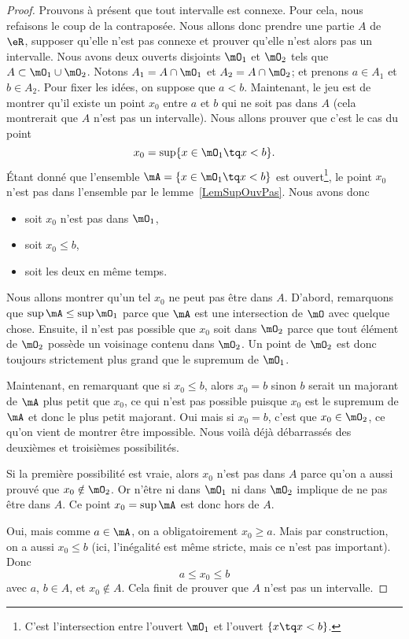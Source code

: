 \begin{proof}
	Prouvons à présent que tout intervalle est connexe. Pour cela, nous refaisons le coup de la contraposée. Nous allons donc prendre une partie \( A\) de \( \eR\), supposer qu'elle n'est pas connexe et prouver qu'elle n'est alors pas un intervalle. Nous avons deux ouverts disjoints \( \mO_1\) et \( \mO_2\) tels que \( A\subset \mO_1\cup \mO_2\). Notons \( A_1 = A \cap \mO_1 \) et \( A_2 = A \cap \mO_2 \); et prenons \( a\in A_1\) et \( b\in A_2\). Pour fixer les idées, on suppose que \( a<b\). Maintenant, le jeu est de montrer qu'il existe un point \( x_0\) entre \( a\) et \( b\) qui ne soit pas dans \( A\) (cela montrerait que \( A\) n'est pas un intervalle). Nous allons prouver que c'est le cas du point
	\[
		x_0=\sup\{ x\in\mO_1\tq x<b \}.
	\]
	Étant donné que l'ensemble \( \mA=\{ x\in\mO_1\tq x<b \}\) est ouvert\footnote{C'est l'intersection entre l'ouvert \( \mO_1\) et l'ouvert \( \{x\tq x<b \}\).}, le point \( x_0\) n'est pas dans l'ensemble par le lemme~\ref{LemSupOuvPas}. Nous avons donc
	\begin{itemize}
		\item soit \( x_0\) n'est pas dans \( \mO_1\),
		\item soit \( x_0\leq b\),
		\item soit les deux en même temps.
	\end{itemize}
	Nous allons montrer qu'un tel \( x_0\) ne peut pas être dans \( A\). D'abord, remarquons que \( \sup\mA\leq\sup\mO_1\) parce que \( \mA\) est une intersection de \( \mO\) avec quelque chose. Ensuite, il n'est pas possible que \( x_0\) soit dans \( \mO_2\) parce que tout élément de \( \mO_2\) possède un voisinage contenu dans \( \mO_2\). Un point de \( \mO_2\) est donc toujours strictement plus grand que le supremum de \( \mO_1\).

	Maintenant, en remarquant que si \( x_0\leq b\), alors \( x_0=b\) sinon \( b\) serait un majorant de \( \mA\) plus petit que \( x_0\), ce qui n'est pas possible puisque \( x_0\) est le supremum de \( \mA\) et donc le plus petit majorant. Oui mais si \( x_0=b\), c'est que \( x_0\in\mO_2\), ce qu'on vient de montrer être impossible. Nous voilà déjà débarrassés des deuxièmes et troisièmes possibilités.

	Si la première possibilité est vraie, alors \( x_0\) n'est pas dans \( A\) parce qu'on a aussi prouvé que \( x_0\notin\mO_2\). Or n'être ni dans \( \mO_1\) ni dans \( \mO_2\) implique de ne pas être dans \( A\). Ce point \( x_0=\sup\mA\) est donc hors de \( A\).

	Oui, mais comme \( a\in\mA\), on a obligatoirement \( x_0\geq a\). Mais par construction, on a aussi \( x_0\leq b\) (ici, l'inégalité est même stricte, mais ce n'est pas important). Donc
	\[
		a\leq x_0\leq b
	\]
	avec \( a\), \( b\in A\), et \( x_0\notin A\). Cela finit de prouver que \( A\) n'est pas un intervalle.
\end{proof}

